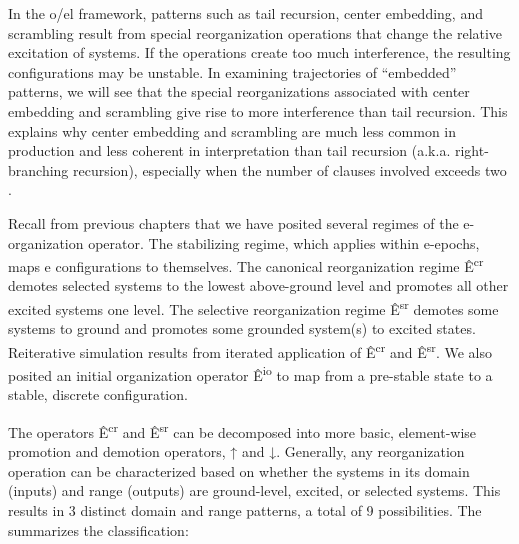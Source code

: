   In the o/el framework, patterns such as tail recursion, center embedding, and scrambling result from special reorganization operations that change the relative excitation of systems. If the operations create too much interference, the resulting configurations may be unstable. In examining trajectories of “embedded” patterns, we will see that the special reorganizations associated with center embedding and scrambling give rise to more interference than tail recursion. This explains why center embedding and scrambling are much less common in production and less coherent in interpretation than tail recursion (a.k.a. right-branching recursion), especially when the number of clauses involved exceeds two \citep{ChristiansenChater1999}. 

  Recall from previous chapters that we have posited several regimes of the e-organization operator. The stabilizing regime, which applies within e-epochs, maps e configurations to themselves. The canonical reorganization regime Ê\textsuperscript{cr} demotes selected systems to the lowest above-ground level and promotes all other excited systems one level. The selective reorganization regime Ê\textsuperscript{sr} demotes some systems to ground and promotes some grounded system(s) to excited states. Reiterative simulation results from iterated application of Ê\textsuperscript{cr} and Ê\textsuperscript{sr}. We also posited an initial organization operator Ê\textsuperscript{io} to map from a pre-stable state to a stable, discrete configuration.

  The operators Ê\textsuperscript{cr} and Ê\textsuperscript{sr} can be decomposed into more basic, element-wise promotion and demotion operators, ↑ and ↓. Generally, any reorganization operation can be characterized based on whether the systems in its domain (inputs) and range (outputs) are ground-level, excited, or selected systems. This results in 3 distinct domain and range patterns, a total of 9 possibilities. The {} summarizes the classification:

